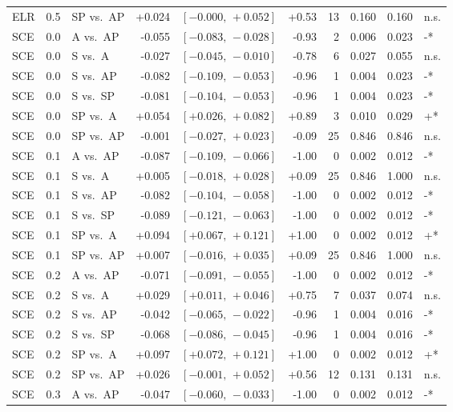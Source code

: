 \begin{landscape}
\begin{scriptsize}
\begin{longtable}{lllrrrrrrl}
ELR & 0.5 & SP vs.\ AP & +0.024 & $[-0.000,\,+0.052]$ & +0.53 & 13 & 0.160 & 0.160 & n.s. \\
SCE & 0.0 & A vs.\ AP & -0.055 & $[-0.083,\,-0.028]$ & -0.93 & 2 & 0.006 & 0.023 & -* \\
SCE & 0.0 & S vs.\ A & -0.027 & $[-0.045,\,-0.010]$ & -0.78 & 6 & 0.027 & 0.055 & n.s. \\
SCE & 0.0 & S vs.\ AP & -0.082 & $[-0.109,\,-0.053]$ & -0.96 & 1 & 0.004 & 0.023 & -* \\
SCE & 0.0 & S vs.\ SP & -0.081 & $[-0.104,\,-0.053]$ & -0.96 & 1 & 0.004 & 0.023 & -* \\
SCE & 0.0 & SP vs.\ A & +0.054 & $[+0.026,\,+0.082]$ & +0.89 & 3 & 0.010 & 0.029 & +* \\
SCE & 0.0 & SP vs.\ AP & -0.001 & $[-0.027,\,+0.023]$ & -0.09 & 25 & 0.846 & 0.846 & n.s. \\
SCE & 0.1 & A vs.\ AP & -0.087 & $[-0.109,\,-0.066]$ & -1.00 & 0 & 0.002 & 0.012 & -* \\
SCE & 0.1 & S vs.\ A & +0.005 & $[-0.018,\,+0.028]$ & +0.09 & 25 & 0.846 & 1.000 & n.s. \\
SCE & 0.1 & S vs.\ AP & -0.082 & $[-0.104,\,-0.058]$ & -1.00 & 0 & 0.002 & 0.012 & -* \\
SCE & 0.1 & S vs.\ SP & -0.089 & $[-0.121,\,-0.063]$ & -1.00 & 0 & 0.002 & 0.012 & -* \\
SCE & 0.1 & SP vs.\ A & +0.094 & $[+0.067,\,+0.121]$ & +1.00 & 0 & 0.002 & 0.012 & +* \\
SCE & 0.1 & SP vs.\ AP & +0.007 & $[-0.016,\,+0.035]$ & +0.09 & 25 & 0.846 & 1.000 & n.s. \\
SCE & 0.2 & A vs.\ AP & -0.071 & $[-0.091,\,-0.055]$ & -1.00 & 0 & 0.002 & 0.012 & -* \\
SCE & 0.2 & S vs.\ A & +0.029 & $[+0.011,\,+0.046]$ & +0.75 & 7 & 0.037 & 0.074 & n.s. \\
SCE & 0.2 & S vs.\ AP & -0.042 & $[-0.065,\,-0.022]$ & -0.96 & 1 & 0.004 & 0.016 & -* \\
SCE & 0.2 & S vs.\ SP & -0.068 & $[-0.086,\,-0.045]$ & -0.96 & 1 & 0.004 & 0.016 & -* \\
SCE & 0.2 & SP vs.\ A & +0.097 & $[+0.072,\,+0.121]$ & +1.00 & 0 & 0.002 & 0.012 & +* \\
SCE & 0.2 & SP vs.\ AP & +0.026 & $[-0.001,\,+0.052]$ & +0.56 & 12 & 0.131 & 0.131 & n.s. \\
SCE & 0.3 & A vs.\ AP & -0.047 & $[-0.060,\,-0.033]$ & -1.00 & 0 & 0.002 & 0.012 & -* \\

\end{longtable}
\end{scriptsize}
\end{landscape}
